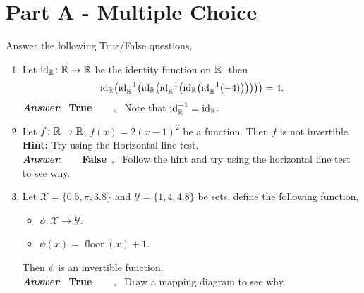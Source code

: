 \documentclass[12pt]{article} %
\begin{document}
\section*{Part A - Multiple Choice}
\begin{qstn} %
  Answer the following True/False questions,
  \begin{enumerate}
    \item Let $\operatorname{id}_\mathbb R \colon \mathbb R \to \mathbb R$ be the identity function on $\mathbb R$, then
       \[
              \operatorname{id}_\R\left(\operatorname{id}^{-1}_\R\left(\operatorname{id}_\R\left(\operatorname{id}^{-1}_\R\left(\operatorname{id}_\R\left(\operatorname{id}^{-1}_\R\left(-4
              \right) \right) \right) \right) \right) \right) = 4
      .\] 
       \textbf{\emph{Answer}}:\,\, \textbf{True} \,\,\,\,\,\, \, , \,
          Note that $\operatorname{id}^{-1}_\mathbb R = \operatorname{id}_\mathbb R$.

    \item Let $f \colon \mathbb R \to \mathbb R$, $f(x) = 2(x - 1)^2$ be a function. Then $f$ is not invertible. \\
      \textbf{Hint: }Try using the Horizontal line test.\\
       \textbf{\emph{Answer}}:\,\,  \,\,\,\,\,\, \textbf{False}\, , \,
          Follow the hint and try using the horizontal line test to see why.

    \item Let $ \mathcal{X} = \{0.5, \pi, 3.8\} $ and $ \mathcal{Y} = \{1,4,4.8\} $ be sets, define the
            following function, 
            \begin{itemize}
              \item $\mathcal{\psi} \colon \mathcal{X} \to \mathcal{Y}$.
              \item $\mathcal{\psi}(x) = \operatorname{floor}(x) + 1$.
            \end{itemize}
            Then $\psi$ is an invertible function.\\
       \textbf{\emph{Answer}}:\,\, \textbf{True} \,\,\,\,\,\, \, , \,
        Draw a mapping diagram to see why.


\end{enumerate}
\end{qstn}
\end{document}
